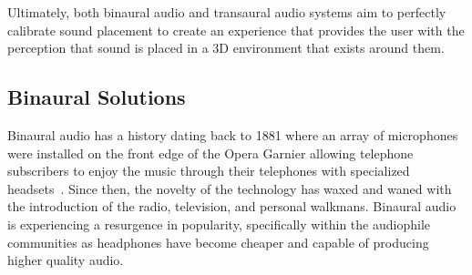 Ultimately, both binaural audio and transaural audio systems aim  to perfectly
calibrate sound placement to create an experience that provides the user with
the perception that sound is placed in a 3D environment that exists around them.



\subsection{                 Binaural Solutions                               }

Binaural audio has a history dating back to 1881 where an array of microphones
were installed on the front edge of the Opera Garnier allowing telephone
subscribers to enjoy the music through their telephones with specialized
headsets~\cite{jost2000transaural}.  Since then, the novelty of the technology
has waxed and waned with the introduction of the radio, television, and personal
walkmans.  Binaural audio is experiencing a resurgence in popularity,
specifically within the audiophile communities as headphones have become
cheaper and capable of producing higher quality audio.


